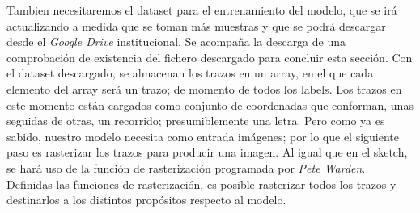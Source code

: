 Tambien necesitaremos el dataset para el entrenamiento del modelo, que se irá
actualizando a medida que se toman más muestras y que se podrá descargar
desde el \textit{Google Drive} institucional. Se acompaña la descarga de una comprobación
de existencia del fichero descargado para concluir esta sección.\newline
Con el dataset descargado, se almacenan los trazos en un array, en el que
cada elemento del array será un trazo; de momento de todos los labels.\newline
Los trazos en este momento están cargados como conjunto de coordenadas que
conforman, unas seguidas de otras, un recorrido; presumiblemente una letra.
Pero como ya es sabido, nuestro modelo necesita como entrada imágenes; por lo que
el siguiente paso es rasterizar los trazos para producir una imagen.\newline
Al igual que en el sketch, se hará uso de la función de rasterización programada
por \textit{Pete Warden}\textsuperscript{\cite{petewardenmw}}. Definidas las funciones de
rasterización, es posible rasterizar todos los trazos y destinarlos a los distintos 
propósitos respecto al modelo.
